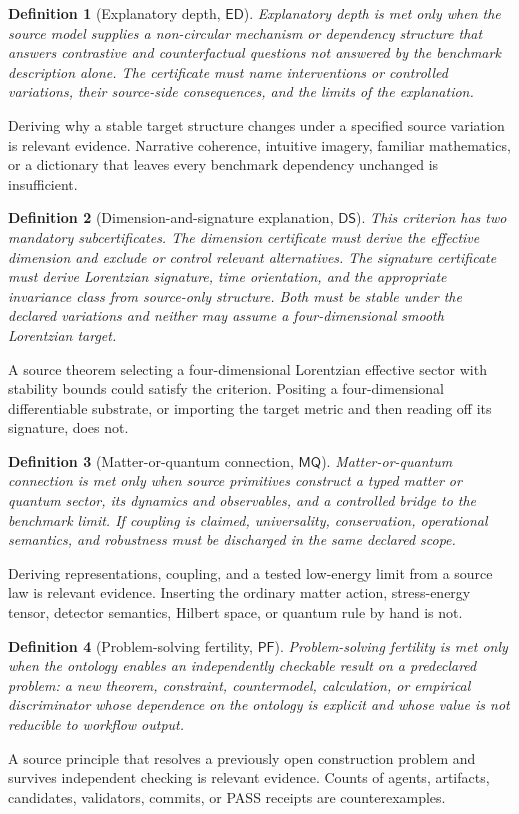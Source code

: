 \documentclass[11pt]{article}
\newtheorem{definition}{Definition}
\newcommand{\ED}{\mathsf{ED}}
\newcommand{\DS}{\mathsf{DS}}
\newcommand{\MQ}{\mathsf{MQ}}
\newcommand{\PF}{\mathsf{PF}}
\begin{document}
\begin{definition}[Explanatory depth, \(\ED\)]
Explanatory depth is met only when the source model supplies a non-circular
mechanism or dependency structure that answers contrastive and
counterfactual questions not answered by the benchmark description alone.
The certificate must name interventions or controlled variations, their
source-side consequences, and the limits of the explanation.
\end{definition}
Deriving why a stable target structure changes under a specified source
variation is relevant evidence.  Narrative coherence, intuitive imagery,
familiar mathematics, or a dictionary that leaves every benchmark dependency
unchanged is insufficient.

\begin{definition}[Dimension-and-signature explanation, \(\DS\)]
This criterion has two mandatory subcertificates.  The dimension certificate
must derive the effective dimension and exclude or control relevant
alternatives.  The signature certificate must derive Lorentzian signature,
time orientation, and the appropriate invariance class from source-only
structure.  Both must be stable under the declared variations and neither may
assume a four-dimensional smooth Lorentzian target.
\end{definition}
A source theorem selecting a four-dimensional Lorentzian effective sector
with stability bounds could satisfy the criterion.  Positing a
four-dimensional differentiable substrate, or importing the target metric and
then reading off its signature, does not.

\begin{definition}[Matter-or-quantum connection, \(\MQ\)]
Matter-or-quantum connection is met only when source primitives construct a
typed matter or quantum sector, its dynamics and observables, and a controlled
bridge to the benchmark limit.  If coupling is claimed, universality,
conservation, operational semantics, and robustness must be discharged in the
same declared scope.
\end{definition}
Deriving representations, coupling, and a tested low-energy limit from a
source law is relevant evidence.  Inserting the ordinary matter action,
stress-energy tensor, detector semantics, Hilbert space, or quantum rule by
hand is not.

\begin{definition}[Problem-solving fertility, \(\PF\)]
Problem-solving fertility is met only when the ontology enables an
independently checkable result on a predeclared problem: a new theorem,
constraint, countermodel, calculation, or empirical discriminator whose
dependence on the ontology is explicit and whose value is not reducible to
workflow output.
\end{definition}
A source principle that resolves a previously open construction problem and
survives independent checking is relevant evidence.  Counts of agents,
artifacts, candidates, validators, commits, or PASS receipts are
counterexamples.
\end{document}
